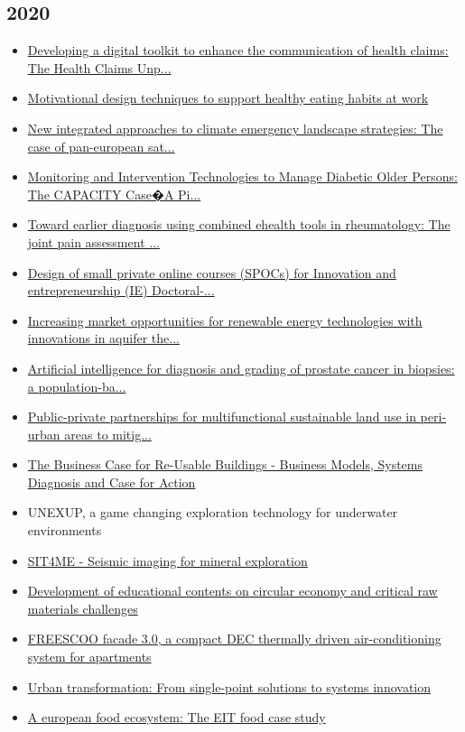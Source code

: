 \subsection*{2020}
\begin{itemize}[leftmargin=*, itemsep=0em, label=\textbullet]
\small
\item \href{https://doi.org/10.1111/nbu.12469}{Developing a digital toolkit to enhance the communication of health claims: The Health Claims Unp...}
\item \href{https://doi.org/10.1109/ICHI48887.2020.9374350}{Motivational design techniques to support healthy eating habits at work}
\item \href{https://doi.org/10.3390/su12208419}{New integrated approaches to climate emergency landscape strategies: The case of pan-european sat...}
\item \href{https://doi.org/10.3389/fendo.2020.00300}{Monitoring and Intervention Technologies to Manage Diabetic Older Persons: The CAPACITY Case�A Pi...}
\item \href{https://doi.org/10.2196/17507}{Toward earlier diagnosis using combined ehealth tools in rheumatology: The joint pain assessment ...}
\item \href{https://doi.org/10.1109/EDUCON45650.2020.9125153}{Design of small private online courses (SPOCs) for Innovation and entrepreneurship (IE) Doctoral-...}
\item \href{https://doi.org/10.1016/j.scitotenv.2019.136142}{Increasing market opportunities for renewable energy technologies with innovations in aquifer the...}
\item \href{https://doi.org/10.1016/S1470-2045(19)30738-7}{Artificial intelligence for diagnosis and grading of prostate cancer in biopsies: a population-ba...}
\item \href{https://doi.org/10.19040/ecocycles.v6i2.180}{Public-private partnerships for multifunctional sustainable land use in peri-urban areas to mitig...}
\item \href{https://doi.org/10.23967/dbmc.2020.228}{The Business Case for Re-Usable Buildings - Business Models, Systems Diagnosis and Case for Action}
\item UNEXUP, a game changing exploration technology for underwater environments
\item \href{https://doi.org/10.3997/2214-4609.202020072}{SIT4ME - Seismic imaging for mineral exploration}
\item \href{https://doi.org/10.1016/j.procir.2020.01.132}{Development of educational contents on circular economy and critical raw materials challenges}
\item \href{https://doi.org/10.18086/swc.2019.55.02}{FREESCOO facade 3.0, a compact DEC thermally driven air-conditioning system for apartments}
\item \href{https://doi.org/10.3390/cli8010017}{Urban transformation: From single-point solutions to systems innovation}
\item \href{https://doi.org/10.1007/978-3-030-33502-1_9}{A european food ecosystem: The EIT food case study}
\end{itemize}

